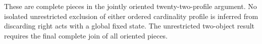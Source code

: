 \begin{remark*}
These are complete pieces in the jointly oriented
twenty-two-profile argument.  No isolated unrestricted
exclusion of either ordered cardinality profile is inferred
from discarding right acts with a global fixed state.
The unrestricted two-object result requires the final
complete join of all oriented pieces.
\end{remark*}
